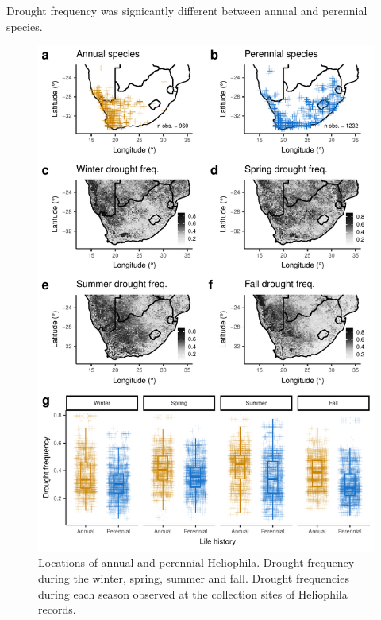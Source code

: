 \documentclass[man,floatsintext]{apa6}
\theoremstyle{definition}
\theoremstyle{definition}
\theoremstyle{definition}
\theoremstyle{remark}
\begin{document}
Drought frequency was signicantly different between annual and perennial
species.






\begin{figure}[!h]
\includegraphics[width=\textwidth]{../figures/maps_boxplots} \caption{Locations of annual and perennial Heliophila. Drought
frequency during the winter, spring, summer and fall. Drought
frequencies during each season observed at the collection sites of
Heliophila records.}\label{fig:mapsboxplots}
\end{figure}
\end{document}
